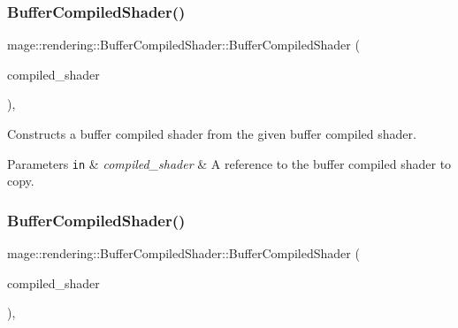 \subsubsection{\texorpdfstring{Buffer\+Compiled\+Shader()}{BufferCompiledShader()}\hspace{0.1cm}{\footnotesize\ttfamily [2/3]}}
{\footnotesize\ttfamily mage\+::rendering\+::\+Buffer\+Compiled\+Shader\+::\+Buffer\+Compiled\+Shader (\begin{DoxyParamCaption}\item[{const \hyperlink{classmage_1_1rendering_1_1_buffer_compiled_shader}{Buffer\+Compiled\+Shader} \&}]{compiled\+\_\+shader }\end{DoxyParamCaption})\hspace{0.3cm}{\ttfamily [default]}, {\ttfamily [noexcept]}}

Constructs a buffer compiled shader from the given buffer compiled shader.


\begin{DoxyParams}[1]{Parameters}
\mbox{\tt in}  & {\em compiled\+\_\+shader} & A reference to the buffer compiled shader to copy. \\
\hline
\end{DoxyParams}
\hypertarget{classmage_1_1rendering_1_1_buffer_compiled_shader_a15ec170bf2864c9dcfa13dff93231a71}{}\label{classmage_1_1rendering_1_1_buffer_compiled_shader_a15ec170bf2864c9dcfa13dff93231a71} 
\subsubsection{\texorpdfstring{Buffer\+Compiled\+Shader()}{BufferCompiledShader()}\hspace{0.1cm}{\footnotesize\ttfamily [3/3]}}
{\footnotesize\ttfamily mage\+::rendering\+::\+Buffer\+Compiled\+Shader\+::\+Buffer\+Compiled\+Shader (\begin{DoxyParamCaption}\item[{\hyperlink{classmage_1_1rendering_1_1_buffer_compiled_shader}{Buffer\+Compiled\+Shader} \&\&}]{compiled\+\_\+shader }\end{DoxyParamCaption})\hspace{0.3cm}{\ttfamily [default]}, {\ttfamily [noexcept]}}

